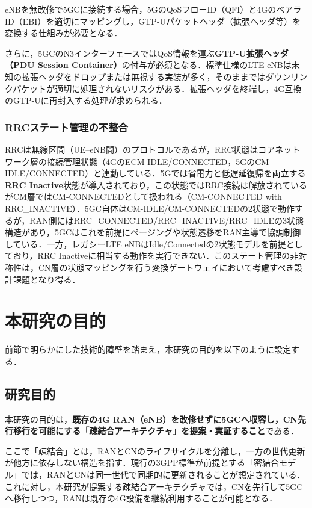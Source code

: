 eNBを無改修で5GCに接続する場合，5GのQoSフローID（QFI）と4GのベアラID（EBI）を適切にマッピングし，GTP-Uパケットヘッダ（拡張ヘッダ等）を変換する仕組みが必要となる．

さらに，5GCのN3インターフェースではQoS情報を運ぶ\textbf{GTP-U拡張ヘッダ（PDU Session Container）}の付与が必須となる．標準仕様のLTE eNBは未知の拡張ヘッダをドロップまたは無視する実装が多く，そのままではダウンリンクパケットが適切に処理されないリスクがある．拡張ヘッダを終端し，4G互換のGTP-Uに再封入する処理が求められる．

\subsubsection{RRCステート管理の不整合}
RRCは無線区間（UE--eNB間）のプロトコルであるが，RRC状態はコアネットワーク層の接続管理状態（4GのECM-IDLE/CONNECTED，5GのCM-IDLE/CONNECTED）と連動している．5Gでは省電力と低遅延復帰を両立する\textbf{RRC Inactive}状態が導入されており\cite{3GPP_TS38331}，この状態ではRRC接続は解放されているがCM層ではCM-CONNECTEDとして扱われる（CM-CONNECTED with RRC\_INACTIVE）．5GC自体はCM-IDLE/\allowbreak CM-CONNECTEDの2状態で動作するが，RAN側にはRRC\_CONNECTED/\allowbreak RRC\_INACTIVE/\allowbreak RRC\_IDLEの3状態構造があり，5GCはこれを前提にページングや状態遷移をRAN主導で協調制御している\cite{3GPP_TS23501_R15}．一方，レガシーLTE eNBはIdle/Connectedの2状態モデルを前提としており，RRC Inactiveに相当する動作を実行できない．このステート管理の非対称性は，CN層の状態マッピングを行う変換ゲートウェイにおいて考慮すべき設計課題となり得る．

\section{本研究の目的}
\label{sec:research_objective}

前節で明らかにした技術的障壁を踏まえ，本研究の目的を以下のように設定する．

\subsection{研究目的}

本研究の目的は，\textbf{既存の4G RAN（eNB）を改修せずに5GCへ収容し，CN先行移行を可能にする「疎結合アーキテクチャ」を提案・実証すること}である．

ここで「疎結合」とは，RANとCNのライフサイクルを分離し，一方の世代更新が他方に依存しない構造を指す．現行の3GPP標準が前提とする「密結合モデル」では，RANとCNは同一世代で同期的に更新されることが想定されている．これに対し，本研究が提案する疎結合アーキテクチャでは，CNを先行して5GCへ移行しつつ，RANは既存の4G設備を継続利用することが可能となる．

